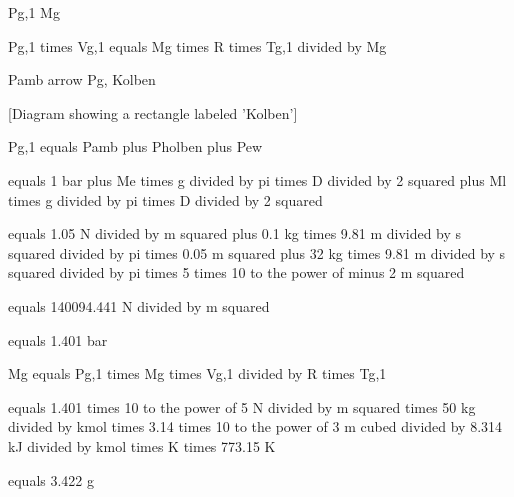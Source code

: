 Pg,1 Mg

Pg,1 times Vg,1 equals Mg times R times Tg,1 divided by Mg

Pamb 
arrow
Pg, Kolben

[Diagram showing a rectangle labeled 'Kolben']

Pg,1 equals Pamb plus Pholben plus Pew

equals 1 bar plus Me times g divided by pi times D divided by 2 squared plus Ml times g divided by pi times D divided by 2 squared

equals 1.05 N divided by m squared plus 0.1 kg times 9.81 m divided by s squared divided by pi times 0.05 m squared plus 32 kg times 9.81 m divided by s squared divided by pi times 5 times 10 to the power of minus 2 m squared

equals 140094.441 N divided by m squared

equals 1.401 bar

Mg equals Pg,1 times Mg times Vg,1 divided by R times Tg,1

equals 1.401 times 10 to the power of 5 N divided by m squared times 50 kg divided by kmol times 3.14 times 10 to the power of 3 m cubed divided by 8.314 kJ divided by kmol times K times 773.15 K

equals 3.422 g